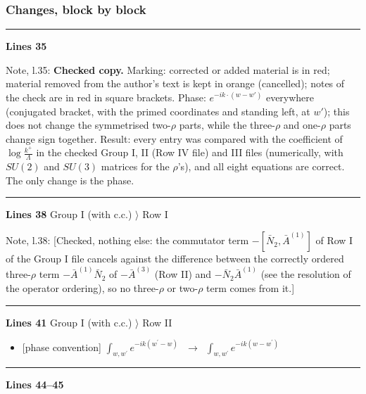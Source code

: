 \documentclass[10pt]{article}
\newenvironment{notebox}{\def\FrameCommand{{\color{notebar}\vrule width 1.5pt}\hspace{6pt}}\MakeFramed{\advance\hsize-\width\FrameRestore}\small}{\endMakeFramed}
\begin{document}
\subsubsection*{Changes, block by block}
\noindent\rule{\linewidth}{0.3pt}\par\noindent\textbf{Lines 35}\par
\begin{notebox}\textsf{\small Note, l.35:} \textbf{Checked copy.} Marking: corrected or added material is in red; material removed from the author's text is kept in orange (cancelled); notes of the check are in red in square brackets. Phase: $e^{-ik\cdot(w-w')}$ everywhere (conjugated bracket, with the primed coordinates and standing left, at $w'$); this does not change the symmetrised two-$\rho$ parts, while the three-$\rho$ and one-$\rho$ parts change sign together. Result: every entry was compared with the coefficient of $\log\frac{k^{+}}{\Lambda}$ in the checked Group I, II (Row IV file) and III files (numerically, with $SU(2)$ and $SU(3)$ matrices for the $\rho$'s), and all eight equations are correct. The only change is the phase.\end{notebox}
\noindent\rule{\linewidth}{0.3pt}\par\noindent\textbf{Lines 38} \quad \textsf{Group I (with c.c.) $\rangle$ Row I}\par
\begin{notebox}\textsf{\small Note, l.38:} [Checked, nothing else: the commutator term $-[\bar N_{2},\bar A^{(1)}]$ of Row I of the Group I file cancels against the difference between the correctly ordered three-$\rho$ term $-\bar A^{(1)}\bar N_{2}$ of $-\bar A^{(3)}$ (Row II) and $-\bar N_{2}\bar A^{(1)}$ (see the resolution of the operator ordering), so no three-$\rho$ or two-$\rho$ term comes from it.]\end{notebox}
\noindent\rule{\linewidth}{0.3pt}\par\noindent\textbf{Lines 41} \quad \textsf{Group I (with c.c.) $\rangle$ Row II} \par
\begin{itemize}[leftmargin=2.2em,itemsep=1pt,topsep=2pt]
\item[\textbf{l.41}] \textsf{\small [phase convention]} $\displaystyle \int_{w, w^\prime} e^{-ik(w^\prime-w)}\,$\ $\longrightarrow$\ $\displaystyle \int_{w, w^\prime} e^{-ik(w-w^\prime)}\,$
\end{itemize}
\noindent\rule{\linewidth}{0.3pt}\par\noindent\textbf{Lines 44--45} \par
\end{document}

